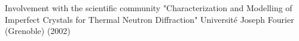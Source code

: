 \begin{rubric}{Involvement with the scientific community}
 "Characterization and Modelling of
Imperfect Crystals for Thermal Neutron Diffraction" Universit\'e Joseph Fourier (Grenoble) (2002)






\end{rubric}